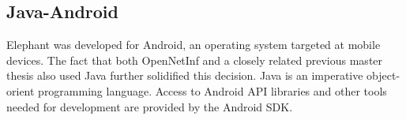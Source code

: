 \subsection{Java-Android}

Elephant was developed for Android, an operating system targeted at mobile devices. The fact that both OpenNetInf and a closely related previous master thesis \cite{hugomiguel} also used Java further solidified this decision. Java is an imperative object-orient programming language. Access to Android API libraries and other tools needed for development are provided by the Android SDK.
